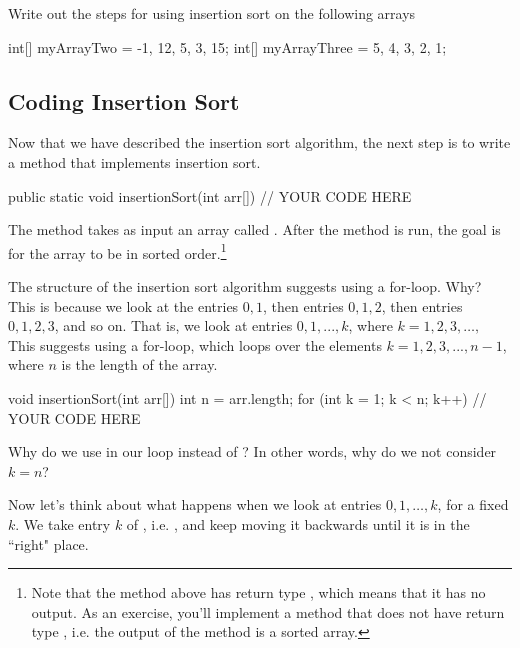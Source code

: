 \begin{exercise}
Write out the steps for using insertion sort on the following arrays
\begin{code}
int[] myArrayTwo = {-1, 12, 5, 3, 15};
int[] myArrayThree = {5, 4, 3, 2, 1};
\end{code}
\end{exercise}
 
\subsection{Coding Insertion Sort}
 
Now that we have described the insertion sort algorithm, the next step is to write a method that implements insertion sort.

\begin{code}
public static void insertionSort(int arr[]) 
{
    // YOUR CODE HERE
}
\end{code}

The method takes as input an array called . After the method is run, the goal is for the array  to be in sorted order.\footnote{Note that the method above has return type , which means that it has no output. As an exercise, you'll implement a method that does not have return type , i.e. the output of the method is a sorted array.}
 
The structure of the insertion sort algorithm suggests using a for-loop. Why? This is because we look at the entries $0,1$, then entries $0,1,2$, then entries $0,1,2,3$, and so on. That is, we look at entries $0, 1, ..., k$, where $k=1, 2, 3, \dots, $ This suggests using a for-loop, which loops over the elements $k=1, 2, 3,  ..., n-1$, where $n$ is the length of the array.

\begin{code}
void insertionSort(int arr[]) 
{
    int n = arr.length;
    for (int k = 1; k < n; k++) 
    {
        // YOUR CODE HERE
    }
}
\end{code}

\begin{exercise}
Why do we use  in our loop instead of ? In other words, why do we not consider $k=n$?
\end{exercise}
 
Now let's think about what happens when we look at entries $0, 1, \dots, k$, for a fixed $k$. We take entry $k$ of , i.e. , and keep moving it backwards until it is in the ``right" place.

